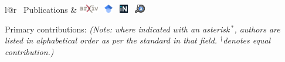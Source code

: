 \documentclass[letterpaper,11pt]{article}
\newcommand{\arxivlogo}{\includegraphics[height=1em]{figures/arxiv-logo.pdf}}
\newcommand{\inspirelogo}{\includegraphics[height=1em]{figures/inspire-logo.pdf}}
\newcommand{\adslogo}{\includegraphics[height=1em]{figures/ads-logo.pdf}}
\newcommand{\scholarlogo}{\includegraphics[height=1em]{figures/gscholar-logo.pdf}}
\begin{document}


\noindent
\begin{tabular*}{\textwidth}{l@{\extracolsep{\fill}}r}
\large {\sc \Large{\faBook~Publications}} & 
\href{https://arxiv.org/a/mishrasharma_s_1.html}{\arxivlogo}  \
\href{https://scholar.google.com/citations?hl=en&user=hJVjhlwAAAAJ&view_op=list_works&sortby=pubdate}{\scholarlogo}  \ 
\href{https://inspirehep.net/authors/1394493}{\inspirelogo}  \ 
\href{https://ui.adsabs.harvard.edu/search/p_=0&q=author%3A%22Mishra-Sharma%2C%20Siddharth%22&sort=date%20desc%2C%20bibcode%20desc}{\adslogo} \\
\hline
\end{tabular*}\vspace{3.5mm}

\noindent
Primary contributions: \emph{(Note: where indicated with an asterisk\,$^*$, authors are listed in alphabetical order as per the standard in that field. $^{\dagger}$denotes equal contribution.)}
\end{document}
